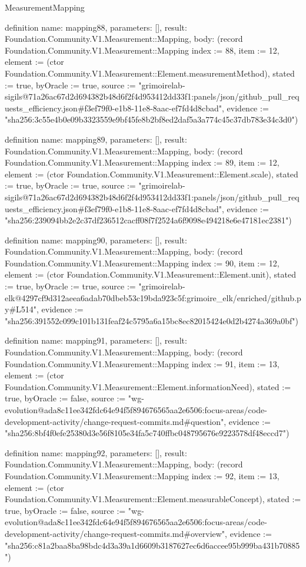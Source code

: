 \begin{lexlean}{MeasurementMapping}
\begin{semanticmodule}
definition{
  name: mapping88,
  parameters: [],
  result: Foundation.Community.V1.Measurement::Mapping,
  body: (record Foundation.Community.V1.Measurement::Mapping {index := 88, item := 12, element := (ctor Foundation.Community.V1.Measurement::Element.measurementMethod), stated := true, byOracle := true, source := "grimoirelab-sigils@71a26ac67d2d694382b48d6f2f4d953412dd33f1:panels/json/github_pull_requests_efficiency.json#f3ef79f0-e1b8-11e8-8aac-ef7fd4d8cbad", evidence := "sha256:3c55e4b0e09b3323559e9bf45fe8b2bf8ed2daf5a3a774c45c37db783e34c3d0"})
}

definition{
  name: mapping89,
  parameters: [],
  result: Foundation.Community.V1.Measurement::Mapping,
  body: (record Foundation.Community.V1.Measurement::Mapping {index := 89, item := 12, element := (ctor Foundation.Community.V1.Measurement::Element.scale), stated := true, byOracle := true, source := "grimoirelab-sigils@71a26ac67d2d694382b48d6f2f4d953412dd33f1:panels/json/github_pull_requests_efficiency.json#f3ef79f0-e1b8-11e8-8aac-ef7fd4d8cbad", evidence := "sha256:239094bb2e2c37df236512cacff08f7f2524a6f9098e494218e6e47181ec2381"})
}

definition{
  name: mapping90,
  parameters: [],
  result: Foundation.Community.V1.Measurement::Mapping,
  body: (record Foundation.Community.V1.Measurement::Mapping {index := 90, item := 12, element := (ctor Foundation.Community.V1.Measurement::Element.unit), stated := true, byOracle := true, source := "grimoirelab-elk@4297cf9d312aeea6adab70dbeb53c19bda923c5f:grimoire_elk/enriched/github.py#L514", evidence := "sha256:391552c099c101b131feaf24c5795a6a15bc8ec82015424e0d2b4274a369a0bf"})
}

definition{
  name: mapping91,
  parameters: [],
  result: Foundation.Community.V1.Measurement::Mapping,
  body: (record Foundation.Community.V1.Measurement::Mapping {index := 91, item := 13, element := (ctor Foundation.Community.V1.Measurement::Element.informationNeed), stated := true, byOracle := false, source := "wg-evolution@ada8c11ee342fdc64e94f5f894676565aa2e6506:focus-areas/code-development-activity/change-request-commits.md#question", evidence := "sha256:8bf4f0efe25380d3e56f8105e34fa5c740ffbc048795676e9223578df48eccd7"})
}

definition{
  name: mapping92,
  parameters: [],
  result: Foundation.Community.V1.Measurement::Mapping,
  body: (record Foundation.Community.V1.Measurement::Mapping {index := 92, item := 13, element := (ctor Foundation.Community.V1.Measurement::Element.measurableConcept), stated := true, byOracle := false, source := "wg-evolution@ada8c11ee342fdc64e94f5f894676565aa2e6506:focus-areas/code-development-activity/change-request-commits.md#overview", evidence := "sha256:c81a2baa8ba98bdc4d3a39a1d6609b3187627ec6d6accee95b999ba431b70885"})
}


\end{semanticmodule}
\end{lexlean}

